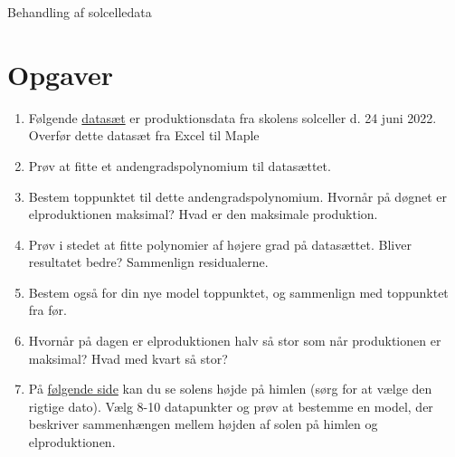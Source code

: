\begin{center}
\Huge
Behandling af solcelledata
\end{center}

\section*{Opgaver}

\begin{enumerate}[label=\roman*)]
	\item Følgende \href{https://github.com/ChristianJLex/TeachingNotes/raw/master/2022-2023/Data%20og%20lign/Solcelledata.xlsx}{\color{blue!60} datasæt} er produktionsdata fra skolens solceller d. 24 juni 2022. 
	Overfør dette datasæt fra Excel til Maple
	\item Prøv at fitte et andengradspolynomium til datasættet. 
	\item Bestem toppunktet til dette andengradspolynomium. Hvornår på døgnet er elproduktionen maksimal? Hvad er den maksimale produktion. 
	\item Prøv i stedet at fitte polynomier af højere grad på datasættet. Bliver resultatet bedre? Sammenlign residualerne. 
	\item Bestem også for din nye model toppunktet, og sammenlign med toppunktet fra før.
	\item Hvornår på dagen er elproduktionen halv så stor som når produktionen er maksimal? Hvad med kvart så stor?
	\item På \href{https://www.suninfo.dk/solhojde/solhojde.php}{\color{blue!60} følgende side} kan du se solens højde på himlen (sørg for at vælge den rigtige dato). Vælg 8-10 datapunkter og prøv at bestemme en model, der beskriver sammenhængen mellem
	højden af solen på himlen og	elproduktionen. 
\end{enumerate}

